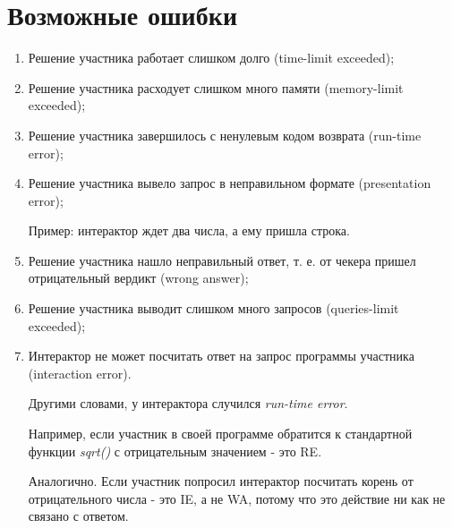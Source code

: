 \section{Возможные ошибки}
\begin{enumerate}
    \item Решение участника работает слишком долго (time-limit exceeded);
    \item Решение участника расходует слишком много памяти (memory-limit exceeded);
    \item Решение участника завершилось с ненулевым кодом возврата (run-time error);
    \item Решение участника вывело запрос в неправильном формате (presentation error);

     Пример: интерактор ждет два числа, а ему пришла строка.

    \item Решение участника нашло неправильный ответ, т. е. от чекера пришел отрицательный вердикт (wrong answer);
    \item Решение участника выводит слишком много запросов (queries-limit exceeded);

    \item Интерактор не может посчитать ответ на запрос программы участника (interaction error).

     Другими словами, у интерактора случился \textit{run-time error}.

     Например, если участник в своей программе обратится к стандартной функции \textit{sqrt()} с отрицательным значением - это RE.

     Аналогично. Если участник попросил интерактор посчитать корень от отрицательного числа - это IE, а не WA, потому что это действие ни как не связано с ответом.
\end{enumerate}


